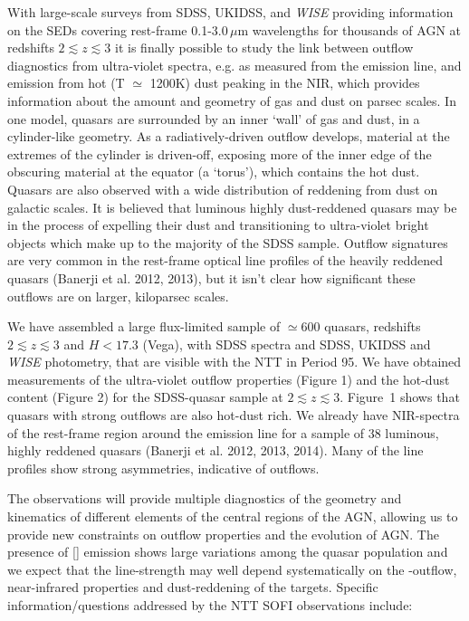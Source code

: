 \vspace{1.5mm}

With large-scale surveys from SDSS, UKIDSS, and \textit{WISE}
providing information on the SEDs covering rest-frame 0.1-3.0\,$\mu$m
wavelengths for thousands of AGN at redshifts $2 \lesssim z \lesssim
3$ it is finally possible to study the link between outflow
diagnostics from ultra-violet spectra, e.g. as measured from the
 emission line, and emission from hot (T $\simeq$ 1200K)
dust peaking in the NIR, which provides information about the amount
and geometry of gas and dust on parsec scales. In one model, quasars
are surrounded by an inner `wall' of gas and dust, in a cylinder-like
geometry. As a radiatively-driven outflow develops, material at the
extremes of the cylinder is driven-off, exposing more of the inner
edge of the obscuring material at the equator (a `torus'), which
contains the hot dust. Quasars are also observed with a wide
distribution of reddening from dust on galactic scales. It is believed
that luminous highly dust-reddened quasars may be in the process of
expelling their dust and transitioning to ultra-violet bright objects
which make up to the majority of the SDSS sample. Outflow signatures
are very common in the rest-frame optical \ha line profiles of
the heavily reddened quasars (Banerji et al. 2012, 2013), but it isn't
clear how significant these outflows are on larger, kiloparsec scales.

We have assembled a large flux-limited sample of $\simeq$600 quasars,
redshifts $2 \lesssim z \lesssim 3$ and $H<17.3$ (Vega), with SDSS
spectra and SDSS, UKIDSS and \textit{WISE} photometry, that are
visible with the NTT in Period 95. We have obtained measurements of
the ultra-violet outflow properties (Figure 1) and the hot-dust
content (Figure 2) for the SDSS-quasar sample at $2 \lesssim z
\lesssim 3$. Figure~1 shows that quasars with strong  outflows are
also hot-dust rich. We already have NIR-spectra of the rest-frame
region around the \ha emission line for a sample of 38 luminous,
highly reddened quasars (Banerji et al. 2012, 2013, 2014). Many of the 
\ha line profiles show strong asymmetries, indicative of outflows.

\vspace{1.5mm}

The observations will provide multiple diagnostics
of the geometry and kinematics of different elements of the central
regions of the AGN, allowing us to provide new constraints on outflow
properties and the evolution of AGN. The presence of []
emission shows large variations among the quasar population and we
expect that the line-strength may well depend systematically on the
-outflow, near-infrared properties and dust-reddening of the
targets. Specific information/questions addressed by the NTT SOFI
observations include:

